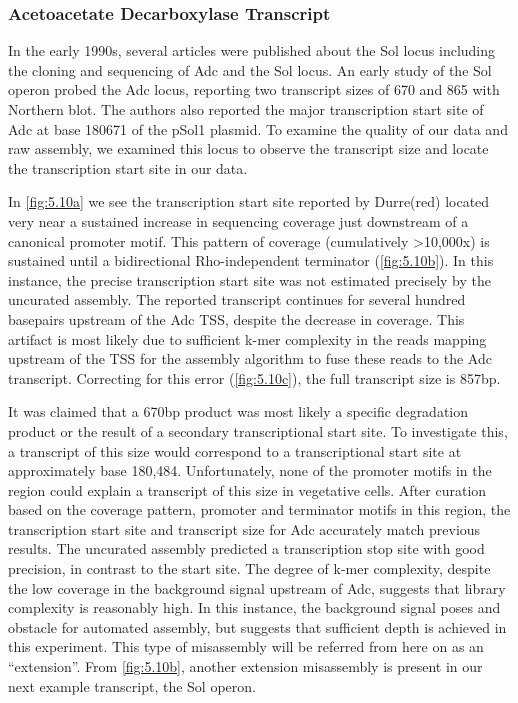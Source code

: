 \subsubsection{Acetoacetate Decarboxylase Transcript}
In the early 1990s, several articles were published about the Sol locus including the cloning and sequencing of Adc and the Sol locus\cite{62,63,64,65,66}. An early study of the Sol operon probed the Adc locus, reporting two transcript sizes of 670 and 865 with Northern blot\cite{65}. The authors also reported the major transcription start site of Adc at base 180671 of the pSol1 plasmid. To examine the quality of our data and raw assembly, we examined this locus to observe the transcript size and locate the transcription start site in our data. 

In \ref{fig:5.10a} we see the transcription start site reported by Durre(red) located very near a sustained increase in sequencing coverage just downstream of a canonical promoter motif. This pattern of coverage (cumulatively \textgreater 10,000x) is sustained until a bidirectional Rho-independent terminator (\ref{fig:5.10b}). In this instance, the precise transcription start site was not estimated precisely by the uncurated assembly. The reported transcript continues for several hundred basepairs upstream of the Adc TSS, despite the decrease in coverage. This artifact is most likely due to sufficient k-mer complexity in the reads mapping upstream of the TSS for the assembly algorithm to fuse these reads to the Adc transcript. Correcting for this error (\ref{fig:5.10c}), the full transcript size is 857bp.

 It was claimed that a 670bp product was most likely a specific degradation product or the result of a secondary transcriptional start site\cite{65}. To investigate this, a transcript of this size would correspond to a transcriptional start site at approximately base 180,484. Unfortunately, none of the promoter motifs in the region could explain a transcript of this size in vegetative cells. After curation based on the coverage pattern, promoter and terminator motifs in this region, the transcription start site and transcript size for Adc accurately match previous results. The uncurated assembly predicted a transcription stop site with good precision, in contrast to the start site. The degree of k-mer complexity, despite the low coverage in the background signal upstream of Adc, suggests that library complexity is reasonably high. In this instance, the background signal poses and obstacle for automated assembly, but suggests that sufficient depth is achieved in this experiment. This type of misassembly will be referred from here on as an ``extension''. From \ref{fig:5.10b}, another extension misassembly is present in our next example transcript, the Sol operon.

